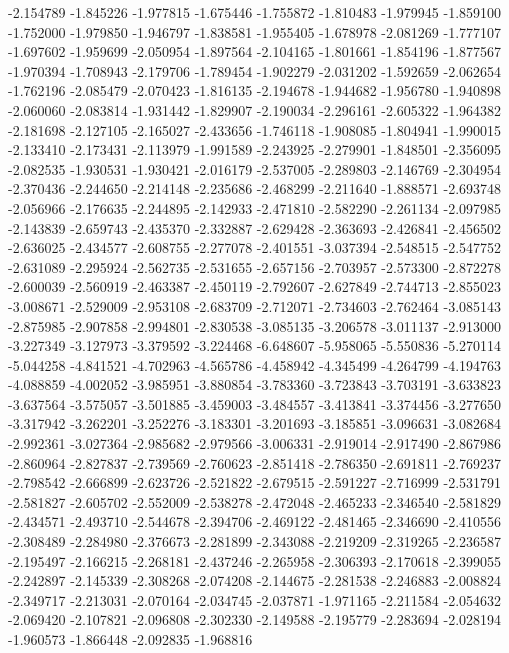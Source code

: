 -2.154789
-1.845226
-1.977815
-1.675446
-1.755872
-1.810483
-1.979945
-1.859100
-1.752000
-1.979850
-1.946797
-1.838581
-1.955405
-1.678978
-2.081269
-1.777107
-1.697602
-1.959699
-2.050954
-1.897564
-2.104165
-1.801661
-1.854196
-1.877567
-1.970394
-1.708943
-2.179706
-1.789454
-1.902279
-2.031202
-1.592659
-2.062654
-1.762196
-2.085479
-2.070423
-1.816135
-2.194678
-1.944682
-1.956780
-1.940898
-2.060060
-2.083814
-1.931442
-1.829907
-2.190034
-2.296161
-2.605322
-1.964382
-2.181698
-2.127105
-2.165027
-2.433656
-1.746118
-1.908085
-1.804941
-1.990015
-2.133410
-2.173431
-2.113979
-1.991589
-2.243925
-2.279901
-1.848501
-2.356095
-2.082535
-1.930531
-1.930421
-2.016179
-2.537005
-2.289803
-2.146769
-2.304954
-2.370436
-2.244650
-2.214148
-2.235686
-2.468299
-2.211640
-1.888571
-2.693748
-2.056966
-2.176635
-2.244895
-2.142933
-2.471810
-2.582290
-2.261134
-2.097985
-2.143839
-2.659743
-2.435370
-2.332887
-2.629428
-2.363693
-2.426841
-2.456502
-2.636025
-2.434577
-2.608755
-2.277078
-2.401551
-3.037394
-2.548515
-2.547752
-2.631089
-2.295924
-2.562735
-2.531655
-2.657156
-2.703957
-2.573300
-2.872278
-2.600039
-2.560919
-2.463387
-2.450119
-2.792607
-2.627849
-2.744713
-2.855023
-3.008671
-2.529009
-2.953108
-2.683709
-2.712071
-2.734603
-2.762464
-3.085143
-2.875985
-2.907858
-2.994801
-2.830538
-3.085135
-3.206578
-3.011137
-2.913000
-3.227349
-3.127973
-3.379592
-3.224468
-6.648607
-5.958065
-5.550836
-5.270114
-5.044258
-4.841521
-4.702963
-4.565786
-4.458942
-4.345499
-4.264799
-4.194763
-4.088859
-4.002052
-3.985951
-3.880854
-3.783360
-3.723843
-3.703191
-3.633823
-3.637564
-3.575057
-3.501885
-3.459003
-3.484557
-3.413841
-3.374456
-3.277650
-3.317942
-3.262201
-3.252276
-3.183301
-3.201693
-3.185851
-3.096631
-3.082684
-2.992361
-3.027364
-2.985682
-2.979566
-3.006331
-2.919014
-2.917490
-2.867986
-2.860964
-2.827837
-2.739569
-2.760623
-2.851418
-2.786350
-2.691811
-2.769237
-2.798542
-2.666899
-2.623726
-2.521822
-2.679515
-2.591227
-2.716999
-2.531791
-2.581827
-2.605702
-2.552009
-2.538278
-2.472048
-2.465233
-2.346540
-2.581829
-2.434571
-2.493710
-2.544678
-2.394706
-2.469122
-2.481465
-2.346690
-2.410556
-2.308489
-2.284980
-2.376673
-2.281899
-2.343088
-2.219209
-2.319265
-2.236587
-2.195497
-2.166215
-2.268181
-2.437246
-2.265958
-2.306393
-2.170618
-2.399055
-2.242897
-2.145339
-2.308268
-2.074208
-2.144675
-2.281538
-2.246883
-2.008824
-2.349717
-2.213031
-2.070164
-2.034745
-2.037871
-1.971165
-2.211584
-2.054632
-2.069420
-2.107821
-2.096808
-2.302330
-2.149588
-2.195779
-2.283694
-2.028194
-1.960573
-1.866448
-2.092835
-1.968816

